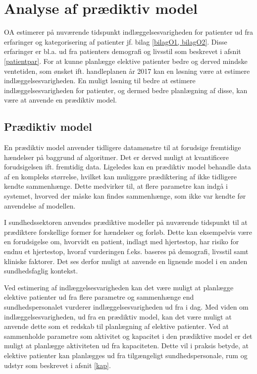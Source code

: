 \chapter{Analyse af prædiktiv model}
OA estimerer på nuværende tidspunkt indlæggelsesvarigheden for patienter ud fra erfaringer og kategorisering af patienter jf. bilag \ref{bilagO1, bilagO2}. Disse erfaringer er bl.a. ud fra patienters demografi og livsstil som beskrevet i afsnit \ref{patientpar}. For at kunne planlægge elektive patienter bedre og derved mindske ventetiden, som ønsket ift. handleplanen år 2017 kan en løsning være at estimere indlæggelsesvarigheden. En muligt løsning til bedre at estimere indlæggelsesvarigheden for patienter, og dermed bedre planlægning af disse, kan være at anvende en prædiktiv model. 


\section{Prædiktiv model} \label{praemodel}
En prædiktiv model anvender tidligere datamønstre til at forudsige fremtidige hændelser på baggrund af algoritmer. Det er derved muligt at kvantificere forudsigelsen ift. fremtidig data. Ligeledes kan en prædiktiv model behandle data af en kompleks størrelse, hvilket kan muliggøre prædiktering af ikke tidligere kendte sammenhænge. Dette medvirker til, at flere parametre kan indgå i systemet, hvorved der måske kan findes sammenhænge, som ikke var kendte før anvendelse af modellen.\cite{Kuhn2013}


I sundhedssektoren anvendes prædiktive modeller på nuværende tidspunkt til at prædiktere forskellige former for hændelser og forløb. Dette kan eksempelvis være en forudsigelse om, hvorvidt en patient, indlagt med hjertestop, har risiko for endnu et hjertestop, hvoraf vurderingen f.eks. baseres på demografi, livsstil samt kliniske faktorer\cite{Hastie2008}. Det ses derfor muligt at anvende en lignende model i en anden sundhedsfaglig kontekst.


Ved estimering af indlæggelsesvarigheden kan det være muligt at planlægge elektive patienter ud fra flere parametre og sammenhænge end sundhedspersonalet vurderer indlæggelsesvarigheden ud fra i dag. Med viden om indlæggelsesvarigheden, ud fra en prædiktiv model, kan det være muligt at anvende dette som et redskab til planlægning af elektive patienter. Ved at sammenholde parametre som aktivitet og kapacitet i den prædiktive model er det muligt at planlægge aktiviteten ud fra kapaciteten. Dette vil i praksis betyde, at elektive patienter kan planlægges ud fra tilgængeligt sundhedspersonale, rum og udstyr som beskrevet i afsnit \ref{kap}. 


